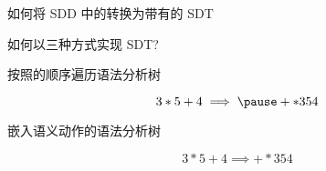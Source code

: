 \begin{frame}{}
  \begin{center}
     如何将 SDD 中的转换为带有的 SDT

    \vspace{0.60cm}
    

    \vspace{0.60cm}
     如何以三种方式实现 SDT?
  \end{center}
\end{frame}

\begin{frame}{}
  \begin{center}

    \vspace{0.80cm}
    按照的顺序遍历语法分析树
  \end{center}
\end{frame}

\begin{frame}{}
  \begin{center}
    \vspace{-0.50cm}
    \[
      3 \ast 5 + 4 \implies \pause + \ast 3 5 4
    \]
  \end{center}
\end{frame}

\begin{frame}{}
  \begin{center}
    嵌入语义动作的语法分析树

    \[
      3 \ast 5 + 4 \implies + \ast 3 5 4
    \]
  \end{center}
\end{frame}

\begin{frame}{}
  
\end{frame}

\begin{frame}{}
  \begin{center}
  \end{center}
\end{frame}

